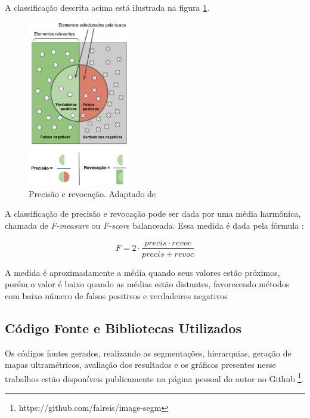 \begin{document}
A classificação descrita acima está ilustrada na figura \ref{fig:PREC_RECALL}. 

\begin{figure}[ht]
\centering
\includegraphics[width=0.4\textwidth]{precision_recall.png}
\caption{Precisão e revocação. Adaptado de \cite{WIKI_PREC_RECALL}}
\label{fig:PREC_RECALL}
\end{figure}

A classificação de precisão e revocação pode ser dada por uma média harmônica, chamada de \textit{F-measure} ou \textit{F-score} balanceada. Essa medida é dada pela fórmula \cite{WIKI_PREC_RECALL}:

\begin{equation}
 F=2 \cdot \frac{precis \cdot revoc}{precis + revoc}
\end{equation}

A medida é aproximadamente a média quando seus valores estão próximos, porém o valor é baixo quando as médias estão distantes, favorecendo métodos com baixo número de falsos positivos e verdadeiros negativos \cite{WIKI_PREC_RECALL}


\subsection{Código Fonte e Bibliotecas Utilizados} \label{ssec:cod_fonte}

Os códigos fontes gerados, realizando as segmentações, hierarquias, geração de mapas ultramétricos, avaliação dos resultados e os gráficos presentes nesse trabalhos estão disponíveis publicamente na página pessoal do autor no Github \footnote{https://github.com/falreis/image-segm}.
\end{document}
